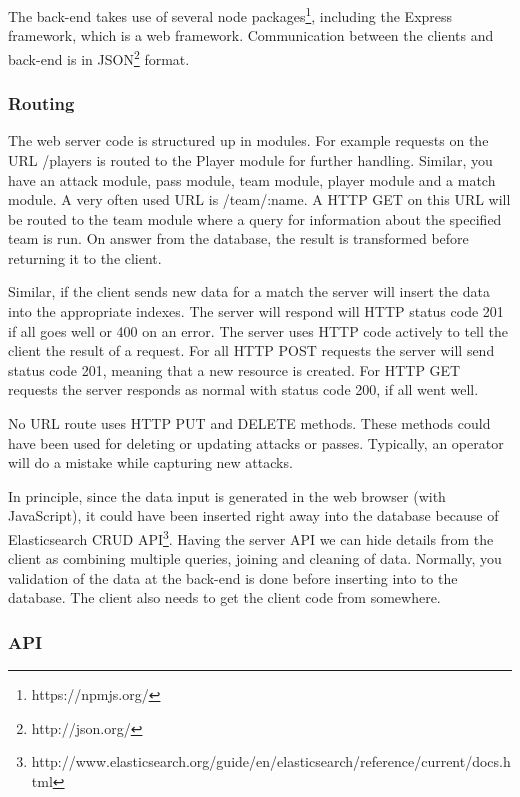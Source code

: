 The back-end takes use of several node packages\footnote{https://npmjs.org/}, including the Express framework, which is a web framework. Communication between the clients and back-end is in JSON\footnote{http://json.org/} format.

\subsubsection{Routing}

The web server code is structured up in modules. For example requests on the URL /players is routed to the Player module for further handling. Similar, you have an attack module, pass module, team module, player module and a match module. A very often used URL is /team/:name. A \ac{HTTP} GET on this URL will be routed to the team module where a query for information about the specified team is run. On answer from the database, the result is transformed before returning it to the client. 

Similar, if the client sends new data for a match the server will insert the data into the appropriate indexes. The server will respond will HTTP status code 201 if all goes well or 400 on an error. The server uses \ac{HTTP} code actively to tell the client the result of a request. For all \ac{HTTP} POST requests the server will send status code 201, meaning that a new resource is created. For \ac{HTTP} GET requests the server responds as normal with status code 200, if all went well. 

No URL route uses \ac{HTTP} PUT and DELETE methods. These methods could have been used for deleting or updating attacks or passes. Typically, an operator will do a mistake while capturing new attacks. 

In principle, since the data input is generated in the web browser (with JavaScript), it could have been inserted right away into the database because of Elasticsearch \ac{CRUD} API\footnote{http://www.elasticsearch.org/guide/en/elasticsearch/reference/current/docs.html}.  Having the server API we can hide details from the client as combining multiple queries, joining and cleaning of data. Normally, you validation of the data at the back-end is done before inserting into to the database. The client also needs to get the client code from somewhere.

\subsubsection{API}

